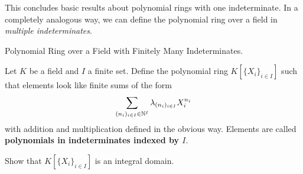 \documentclass[../book.tex]{subfiles}
\begin{document}
This concludes basic results about polynomial rings with one indeterminate.
In a completely analogous way, 
we can define the polynomial ring over a field in \emph{multiple indeterminates}. 

\begin{ex} Polynomial Ring over a Field with Finitely Many Indeterminates.
    
    Let $K$ be a field and $I$ a finite set. 
    Define the polynomial ring $K[\{X_i\}_{i \in I}]$
    such that elements look like finite sums of the form \[
        \sum_{(n_i)_{i\in I} \in \mathbb{N}^I} \lambda_{(n_i)_{i\in I}} X_i^{n_i}
    \]
    with addition and multiplication defined in the obvious way. 
    Elements are called \textbf{polynomials in indeterminates indexed by $I$}. 

    Show that $K[\{X_i\}_{i \in I}]$ is an integral domain. 
\end{ex}

\end{document}

